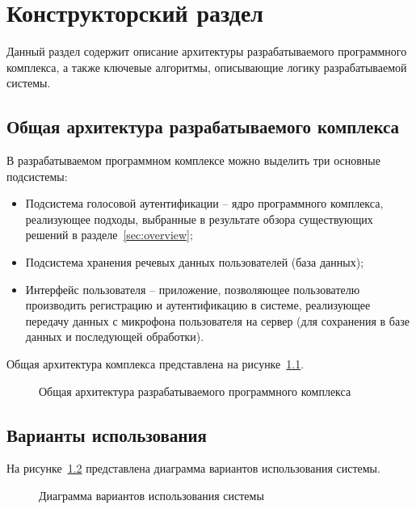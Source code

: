\chapter{Конструкторский раздел}
Данный раздел содержит описание архитектуры разрабатываемого программного комплекса, а также ключевые алгоритмы, описывающие логику разрабатываемой системы.

\section{Общая архитектура разрабатываемого комплекса}
\label{sec:main_arch}

В разрабатываемом программном комплексе можно выделить три основные подсистемы:
\begin{itemize}
\item Подсистема голосовой аутентификации -- ядро программного комплекса, реализующее подходы, выбранные в результате обзора существующих решений в разделе~\ref{sec:overview};
\item Подсистема хранения речевых данных пользователей (база данных);
\item Интерфейс пользователя -- приложение, позволяющее пользователю производить регистрацию и аутентификацию в системе, реализующее передачу данных с микрофона пользователя на сервер (для сохранения в базе данных и последующей обработки).
\end{itemize}

Общая архитектура комплекса представлена на рисунке~\ref{fig:main_arch}.

\begin{figure}
    \caption{Общая архитектура разрабатываемого программного комплекса}
    \label{fig:main_arch}
\end{figure}

\section{Варианты использования}

На рисунке~\ref{fig:use_cases} представлена диаграмма вариантов использования системы.

\begin{figure}[htp!]
    \caption{Диаграмма вариантов использования системы}
    \label{fig:use_cases}
\end{figure}

